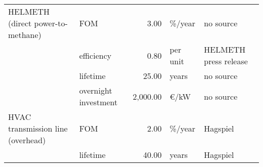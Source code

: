 \begin{longtable}{p{4cm}p{4cm}rp{3cm}p{10cm}}
HELMETH (direct power-to-methane) & FOM &         3.00 &                       \%/year &                                                                                                                                                                                                                                                                                                                            no source \\
                      & efficiency &         0.80 &                      per unit &                                                                                                                                                                                                                                                                                                                HELMETH press release \\
                      & lifetime &        25.00 &                         years &                                                                                                                                                                                                                                                                                                                            no source \\
                      & overnight investment &     2,000.00 &                      \euro/kW &                                                                                                                                                                                                                                                                                                                            no source \\
HVAC transmission line (overhead) & FOM &         2.00 &                       \%/year &                                                                                                                                                                                                                                                                                                                             Hagspiel \\
                      & lifetime &        40.00 &                         years &                                                                                                                                                                                                                                                                                                                             Hagspiel \\

\end{longtable}
